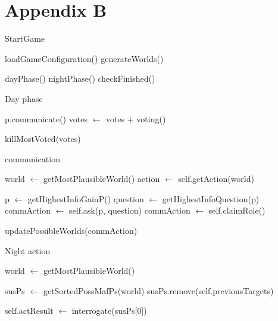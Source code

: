 \section{Appendix B}\label{app:B}
\begin{algorithm}
	\caption{StartGame}
	\begin{algorithmic}[1]
		\State loadGameConfiguration()
		\State generateWorlds()

		\State dayPhase()
		\State nightPhase()
		\State checkFinished()
		\EndWhile
		\EndFunction
	\end{algorithmic}
\end{algorithm}

\begin{algorithm}
	\caption{Day phase}
	\begin{algorithmic}[1]
		\State p.communicate()
		\State votes $\gets$ votes + voting()
		\EndFor

		\State killMostVoted(votes)
		\EndFunction
	\end{algorithmic}
\end{algorithm}

\begin{algorithm}
	\caption{communication}
	\begin{algorithmic}[1]
		\State world $\gets$ getMostPlausibleWorld()
		\State action $\gets$ self.getAction(world)

		\State p $\gets$ getHighestInfoGainP()
		\State question $\gets$ getHighestInfoQuestion(p)
		\State commAction $\gets$ self.ask(p, question)
		\State commAction $\gets$ self.claimRole()
		\EndIf

		\State updatePossibleWorlds(commAction)
		\EndFunction
	\end{algorithmic}
\end{algorithm}

\begin{algorithm}
	\caption{Night action}
	\begin{algorithmic}[1]
		\State world $\gets$ getMostPlausibleWorld()

		\State susPs $\gets$ getSortedPossMafPs(world)
		\State susPs.remove(self.previousTargets)

		\State self.actResult $\gets$ interrogate(susPs[0])
		\EndIf
		\EndFunction

		\Statex
	\end{algorithmic}
\end{algorithm}


